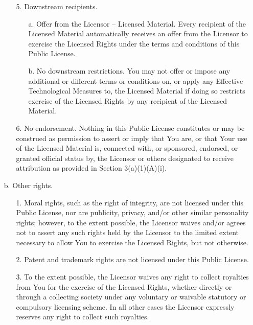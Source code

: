 \begin{scriptsize}
\begin{itemize}
\begin{itemize}
       \item[5.] Downstream recipients.

		\begin{itemize}
            \item[a.] Offer from the Licensor -- Licensed Material. Every
               recipient of the Licensed Material automatically
               receives an offer from the Licensor to exercise the
               Licensed Rights under the terms and conditions of this
               Public License.

            \item[b.] No downstream restrictions. You may not offer or impose
               any additional or different terms or conditions on, or
               apply any Effective Technological Measures to, the
               Licensed Material if doing so restricts exercise of the
               Licensed Rights by any recipient of the Licensed
               Material.
		\end{itemize}

       \item[6.] No endorsement. Nothing in this Public License constitutes or
          may be construed as permission to assert or imply that You
          are, or that Your use of the Licensed Material is, connected
          with, or sponsored, endorsed, or granted official status by,
          the Licensor or others designated to receive attribution as
          provided in Section 3(a)(1)(A)(i).
	\end{itemize}

  \item[b.] Other rights.

	\begin{itemize}
       \item[1.] Moral rights, such as the right of integrity, are not
          licensed under this Public License, nor are publicity,
          privacy, and/or other similar personality rights; however, to
          the extent possible, the Licensor waives and/or agrees not to
          assert any such rights held by the Licensor to the limited
          extent necessary to allow You to exercise the Licensed
          Rights, but not otherwise.

       \item[2.] Patent and trademark rights are not licensed under this
          Public License.

       \item[3.] To the extent possible, the Licensor waives any right to
          collect royalties from You for the exercise of the Licensed
          Rights, whether directly or through a collecting society
          under any voluntary or waivable statutory or compulsory
          licensing scheme. In all other cases the Licensor expressly
          reserves any right to collect such royalties.
	\end{itemize}
\end{itemize}



\end{scriptsize}
